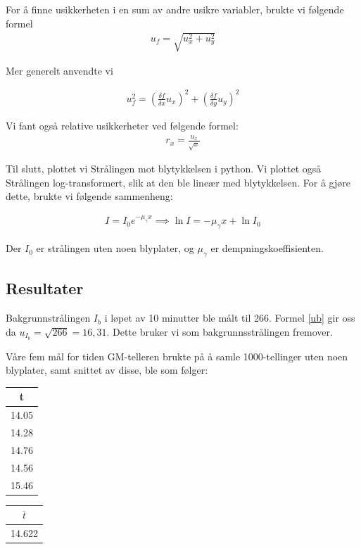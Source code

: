 For å finne usikkerheten i en sum av andre usikre variabler, brukte vi følgende formel
\begin{align}
    u_f = \sqrt{u_x^2 +u_y^2}\label{au2}
\end{align}

Mer generelt anvendte vi 

\begin{align}
    u_f^2 = \left(\frac{\delta f}{\delta x} u_x\right)^2 + \left(\frac{\delta f}{\delta y} u_y\right)^2\label{gu3}
\end{align}

Vi fant også relative usikkerheter ved følgende formel:
\begin{align}
    r_x = \frac{u_x}{\sqrt{x}}
\end{align}


Til slutt, plottet vi Strålingen mot blytykkelsen i python. Vi plottet også Strålingen log-transformert, slik at den ble lineær med blytykkelsen. For å gjøre dette, brukte vi følgende sammenheng:

\begin{align}
    I = I_0e^{-\mu_\gamma x} \implies \ln{I} = -\mu_\gamma x + \ln{I_0}\label{stbt}
\end{align}

Der $I_0$ er strålingen uten noen blyplater, og $\mu_\gamma$ er dempningskoeffisienten. 

\subsection{Resultater}

Bakgrunnstrålingen $I_b$ i løpet av 10 minutter ble målt til 266. Formel \ref{ub} gir oss da $u_{I_b} = \sqrt{266} = 16,31$. Dette bruker vi som bakgrunnsstrålingen fremover. \medskip

Våre fem mål for tiden GM-telleren brukte på å samle 1000-tellinger uten noen blyplater, samt snittet av disse, ble som følger:

\begin{center}
\begin{tabular}{ | c | }
    \hline
    t\\ 
    \hline
    14.05\\ 
    \hline
    14.28\\ 
    \hline
    14.76\\ 
    \hline
    14.56\\ 
    \hline
    15.46\\ 
    \hline
\end{tabular}\;\;\;
\begin{tabular}{ | c | }
    \hline
    $\overline{t}$\\ 
    \hline
    14.622\\ 
    \hline
\end{tabular}
\end{center}

